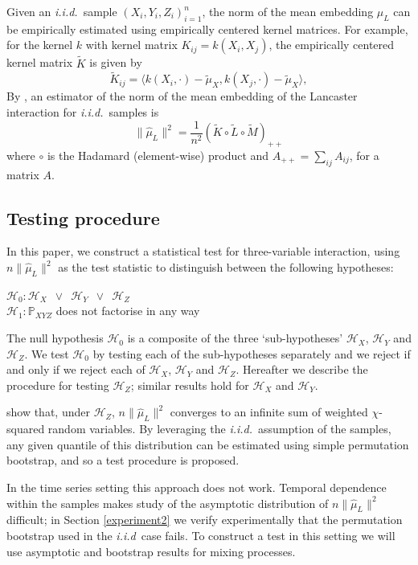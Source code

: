 \documentclass[]{article}
\begin{document}
 Given an \emph{i.i.d.}~sample $(X_i,Y_i,Z_i)_{i=1}^n$, the norm of the mean embedding $\mu_L$ can be empirically estimated using empirically centered kernel matrices. For example, for the kernel $k$ with kernel matrix $K_{ij} = k(X_i,X_j)$, the empirically centered kernel matrix $\tilde{K}$ is given by
\[
\tilde{K}_{ij} = \langle k(X_i,\cdot)-\tilde{\mu}_X, k(X_j,\cdot) -\tilde{\mu}_X \rangle,
\]
 By \citet{sejdinovic2013kernel}, an estimator of the norm of the mean embedding of the Lancaster interaction for \emph{i.i.d.}~samples is 
\begin{equation}\label{eqn:lancaster}
\|\hat \mu_L\|^2 = \frac{1}{n^2}\left(\tilde{K}\circ\tilde{L}\circ\tilde{M}\right)_{++}
\end{equation}
where $\circ$ is the Hadamard (element-wise) product and $A_{++} = \sum_{ij}A_{ij}$, for a matrix $A$.


\subsection{Testing procedure}

In this paper, we construct a statistical test for three-variable interaction, using $n\|\hat \mu_L\|^2$ as the test statistic to distinguish between the following hypotheses:

$\mathcal{H}_0: \mathcal{H}_X \enspace \lor \enspace \mathcal{H}_Y \enspace \lor \enspace \mathcal{H}_Z $\\
$\mathcal{H}_1: \mathbb{P}_{XYZ}$ does not factorise in any way


The null hypothesis $\mathcal{H}_0$ is a composite of the three `sub-hypotheses' $\mathcal{H}_X$, $\mathcal{H}_Y$ and $\mathcal{H}_Z$. We test $\mathcal{H}_0$ by testing each of the sub-hypotheses separately and we reject if and only if we reject each of $\mathcal{H}_X$, $\mathcal{H}_Y$ and $\mathcal{H}_Z$. Hereafter we describe the procedure for testing $\mathcal{H}_Z$; similar results hold for $\mathcal{H}_X$ and $\mathcal{H}_Y$.

\citet{sejdinovic2013kernel} show that, under $\mathcal{H}_Z$, $n \|\hat \mu_L\|^2 $ converges to an infinite sum of weighted $\chi$-squared random variables. By leveraging the \emph{i.i.d.}~assumption of the samples, any given quantile of this  distribution  can be estimated using simple permutation bootstrap, and so a test procedure is proposed.

In the time series setting this approach does not work. Temporal dependence within the samples makes  study of the asymptotic distribution of $n \|\hat \mu_L\|^2 $ difficult; in Section \ref{experiment2} we verify experimentally that the permutation bootstrap used in the \emph{i.i.d}~case fails. To construct a test in this setting we will use asymptotic and bootstrap results for mixing processes. 
\end{document}
